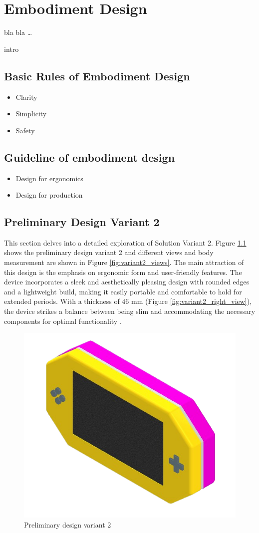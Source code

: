 \chapter{Embodiment Design}

bla bla \dots

intro

\section{Basic Rules of Embodiment Design}
\begin{itemize}
    \item Clarity
    \item Simplicity
    \item Safety
\end{itemize}

\section{Guideline of embodiment design}
\begin{itemize}
    \item Design for ergonomics
    \item Design for production
\end{itemize}




\section{Preliminary Design Variant 2}
This section delves into a detailed exploration of Solution Variant 2. Figure \ref{fig:preliminary_design_variant_2} shows the preliminary design variant 2 and different views and body measurement are shown in Figure \ref{fig:variant2_views}. The main attraction of this design is the emphasis on ergonomic form and user-friendly features. The device incorporates a sleek and aesthetically pleasing design with rounded edges and a lightweight build, making it easily portable and comfortable to hold for extended periods. With a thickness of 46 mm (Figure \ref{fig:variant2_right_view}), the device strikes a balance between being slim and accommodating the necessary components for optimal functionality .

\begin{figure}[h!]
    \centering
    \includegraphics[height=5 cm]{texs/Part1/chapter4/image/v21.png}
    \caption{Preliminary design variant 2}
    \label{fig:preliminary_design_variant_2}
\end{figure}

